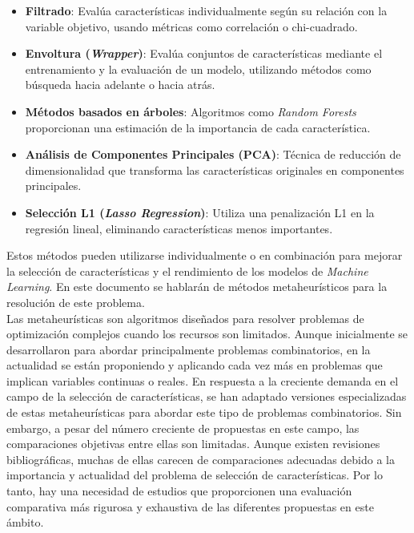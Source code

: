 \begin{itemize}
       \item \textbf{Filtrado}: Evalúa características individualmente según su relación con la variable objetivo, usando métricas como correlación o chi-cuadrado.
       \item \textbf{Envoltura (\textit{Wrapper})}: Evalúa conjuntos de características mediante el entrenamiento y la evaluación de un modelo, utilizando métodos como búsqueda hacia adelante o hacia atrás.
       \item \textbf{Métodos basados en árboles}: Algoritmos como \textit{Random Forests} proporcionan una estimación de la importancia de cada característica.
       \item \textbf{Análisis de Componentes Principales (PCA)}: Técnica de reducción de dimensionalidad que transforma las características originales en componentes principales.
       \item \textbf{Selección L1 (\textit{Lasso Regression})}: Utiliza una penalización L1 en la regresión lineal, eliminando características menos importantes.
\end{itemize}

Estos métodos pueden utilizarse individualmente o en combinación para mejorar la selección de características y el rendimiento de los modelos de \textit{Machine Learning}. En este documento se hablarán de métodos metaheurísticos para la resolución de este problema.\\[6pt]

Las metaheurísticas son algoritmos diseñados para resolver problemas de optimización complejos cuando los recursos son limitados. Aunque inicialmente se desarrollaron para abordar principalmente problemas combinatorios, en la actualidad se están proponiendo y aplicando cada vez más en problemas que implican variables continuas o reales. En respuesta a la creciente demanda en el campo de la selección de características, se han adaptado versiones especializadas de estas metaheurísticas para abordar este tipo de problemas combinatorios. Sin embargo, a pesar del número creciente de propuestas en este campo, las comparaciones objetivas entre ellas son limitadas. Aunque existen revisiones bibliográficas, muchas de ellas carecen de comparaciones adecuadas debido a la importancia y actualidad del problema de selección de características. Por lo tanto, hay una necesidad de estudios que proporcionen una evaluación comparativa más rigurosa y exhaustiva de las diferentes propuestas en este ámbito.\\[6pt]

